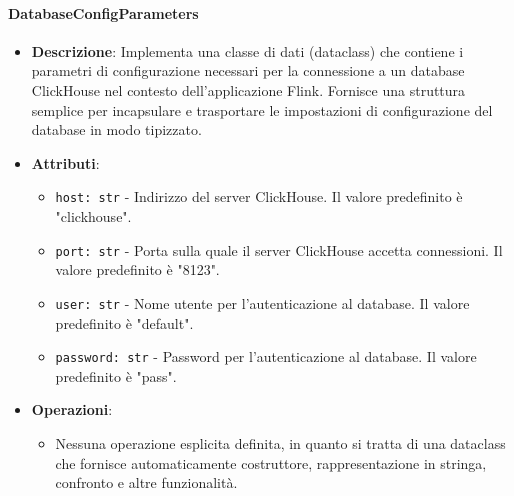\documentclass[10pt]{article}
\begin{document}
    \paragraph{DatabaseConfigParameters}
    \begin{itemize} 
    \item \textbf{Descrizione}: Implementa una classe di dati (dataclass) che contiene i parametri di configurazione necessari per la connessione a un database ClickHouse nel contesto dell'applicazione Flink. Fornisce una struttura semplice per incapsulare e trasportare le impostazioni di configurazione del database in modo tipizzato.
    \item \textbf{Attributi}:
    \begin{itemize}
        \item \texttt{host: str} - Indirizzo del server ClickHouse. Il valore predefinito è "clickhouse".
        \item \texttt{port: str} - Porta sulla quale il server ClickHouse accetta connessioni. Il valore predefinito è "8123".
        \item \texttt{user: str} - Nome utente per l'autenticazione al database. Il valore predefinito è "default".
        \item \texttt{password: str} - Password per l'autenticazione al database. Il valore predefinito è "pass".
    \end{itemize}
    
    \item \textbf{Operazioni}:
    \begin{itemize}
        \item Nessuna operazione esplicita definita, in quanto si tratta di una dataclass che fornisce automaticamente costruttore, rappresentazione in stringa, confronto e altre funzionalità.
    \end{itemize}
    \end{itemize}
\end{document}

